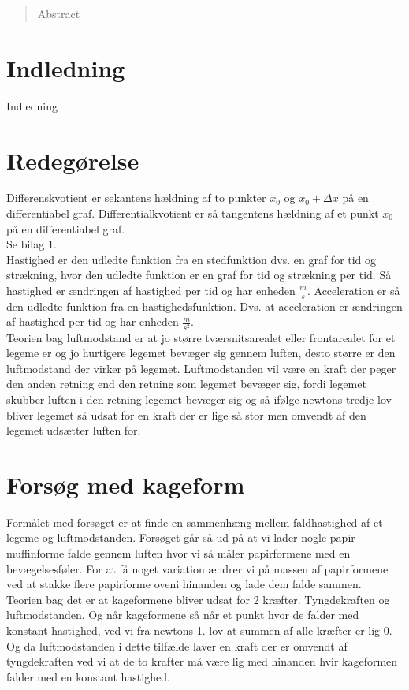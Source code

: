 \documentclass[12pt]{article}
\begin{document}
\begin{abstract}
Abstract
\end{abstract}
\pagebreak

\tableofcontents
\pagebreak

\section{Indledning}
Indledning
\section{Redegørelse}
Differenskvotient er sekantens hældning af to punkter $x_{0}$ og $x_{0}+\Delta x$ på en differentiabel graf.
Differentialkvotient er så tangentens hældning af et punkt $x_{0}$ på en differentiabel graf.\\
Se bilag 1.\\
Hastighed er den udledte funktion fra en stedfunktion dvs. en graf for tid og strækning, hvor den udledte funktion er en graf for tid og strækning per tid. Så hastighed er ændringen af hastighed per tid og har enheden $\frac{m}{s}$.
Acceleration er så den udledte funktion fra en hastighedsfunktion. Dvs. at acceleration er ændringen af hastighed per tid og har enheden $\frac{m}{s^2}$.\\
Teorien bag luftmodstand er at jo større tværsnitsarealet eller frontarealet for et legeme er og jo hurtigere legemet bevæger sig gennem luften, desto større er den luftmodstand der virker på legemet. Luftmodstanden vil være en kraft der peger den anden retning end den retning som legemet bevæger sig,
fordi legemet skubber luften i den retning legemet bevæger sig og så ifølge newtons tredje lov bliver legemet så udsat for en kraft der er lige så stor men omvendt af den legemet udsætter luften for.


\section{Forsøg med kageform}
Formålet med forsøget er at finde en sammenhæng mellem faldhastighed af et legeme og luftmodstanden. Forsøget går så ud på at vi lader nogle papir muffinforme falde gennem luften
hvor vi så måler papirformene med en bevægelsesføler. For at få noget variation ændrer vi på massen af papirformene ved at stakke flere papirforme oveni hinanden og lade dem falde sammen.\\
Teorien bag det er at kageformene bliver udsat for 2 kræfter. Tyngdekraften og luftmodstanden. Og når kageformene så når et punkt hvor de falder med konstant hastighed, ved vi fra newtons 1. lov
at summen af alle kræfter er lig 0. Og da luftmodstanden i dette tilfælde laver en kraft der er omvendt af tyngdekraften ved vi at de to krafter må være lig med hinanden hvir kageformen falder med
en konstant hastighed.
\end{document}
